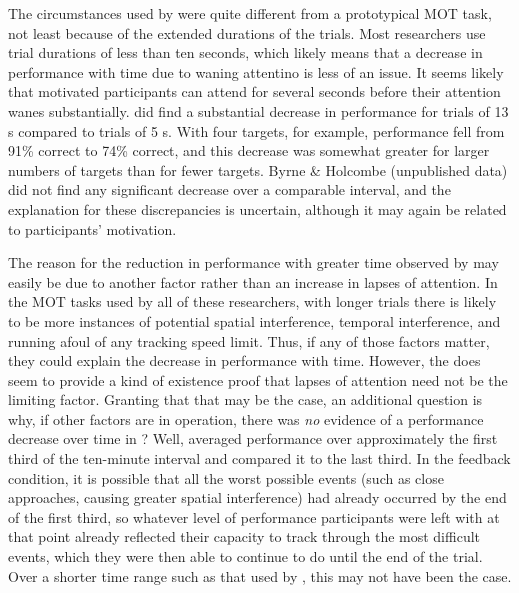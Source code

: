 \documentclass[
]{book}
\begin{document}
The circumstances used by \citet{wolfeMultipleObjectJuggling2007} were quite different from a prototypical MOT task, not least because of the extended durations of the trials. Most researchers use trial durations of less than ten seconds, which likely means that a decrease in performance with time due to waning attentino is less of an issue. It seems likely that motivated participants can attend for several seconds before their attention wanes substantially. \citet{oksamaMultipleObjectTracking2004} did find a substantial decrease in performance for trials of 13 s compared to trials of 5 s. With four targets, for example, performance fell from 91\% correct to 74\% correct, and this decrease was somewhat greater for larger numbers of targets than for fewer targets. Byrne \& Holcombe (unpublished data) did not find any significant decrease over a comparable interval, and the explanation for these discrepancies is uncertain, although it may again be related to participants' motivation.

The reason for the reduction in performance with greater time observed by \citet{oksamaMultipleObjectTracking2004} may easily be due to another factor rather than an increase in lapses of attention. In the MOT tasks used by all of these researchers, with longer trials there is likely to be more instances of potential spatial interference, temporal interference, and running afoul of any tracking speed limit. Thus, if any of those factors matter, they could explain the decrease in performance with time. However, the \citet{wolfeMultipleObjectJuggling2007} does seem to provide a kind of existence proof that lapses of attention need not be the limiting factor. Granting that that may be the case, an additional question is why, if other factors are in operation, there was \emph{no} evidence of a performance decrease over time in \citet{wolfeMultipleObjectJuggling2007}? Well, \citet{wolfeMultipleObjectJuggling2007} averaged performance over approximately the first third of the ten-minute interval and compared it to the last third. In the feedback condition, it is possible that all the worst possible events (such as close approaches, causing greater spatial interference) had already occurred by the end of the first third, so whatever level of performance participants were left with at that point already reflected their capacity to track through the most difficult events, which they were then able to continue to do until the end of the trial. Over a shorter time range such as that used by \citet{oksamaMultipleObjectTracking2004}, this may not have been the case.
\end{document}
